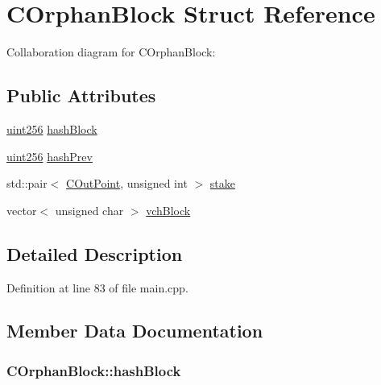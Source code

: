 \hypertarget{struct_c_orphan_block}{}\section{C\+Orphan\+Block Struct Reference}
\label{struct_c_orphan_block}


Collaboration diagram for C\+Orphan\+Block\+:
\subsection*{Public Attributes}
\begin{DoxyCompactItemize}
\item 
\hyperlink{classuint256}{uint256} \hyperlink{struct_c_orphan_block_ab4d0e535f5020a6c765ce3e1d58b5cb8}{hash\+Block}
\item 
\hyperlink{classuint256}{uint256} \hyperlink{struct_c_orphan_block_a8c6e5d47d1da746d59feefdc0eb9f55c}{hash\+Prev}
\item 
std\+::pair$<$ \hyperlink{class_c_out_point}{C\+Out\+Point}, unsigned int $>$ \hyperlink{struct_c_orphan_block_a11bf8c661061349166e335ba0dedd7fb}{stake}
\item 
vector$<$ unsigned char $>$ \hyperlink{struct_c_orphan_block_a6d63003bce14214976acc149cd4813e8}{vch\+Block}
\end{DoxyCompactItemize}


\subsection{Detailed Description}


Definition at line 83 of file main.\+cpp.



\subsection{Member Data Documentation}
\hypertarget{struct_c_orphan_block_ab4d0e535f5020a6c765ce3e1d58b5cb8}{}
\subsubsection[{hash\+Block}]{ C\+Orphan\+Block\+::hash\+Block}\label{struct_c_orphan_block_ab4d0e535f5020a6c765ce3e1d58b5cb8}


